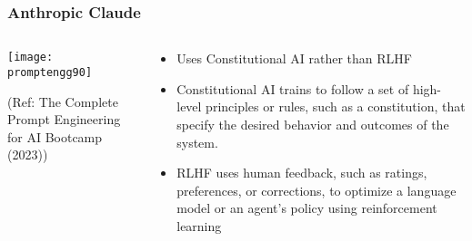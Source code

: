 



\begin{frame}[fragile]\frametitle{Anthropic Claude}


\begin{columns}
    \begin{column}[T]{0.6\linewidth}
		\begin{center}
		\texttt{[image: promptengg90]}

		{\tiny (Ref: The Complete Prompt Engineering for AI Bootcamp (2023))}
		\end{center}	
    \end{column}
    \begin{column}[T]{0.4\linewidth}
	
	    \begin{itemize}
        \item 
		Uses Constitutional AI rather than RLHF
		\item Constitutional AI trains to follow a set of high-level principles or rules, such as a constitution, that specify the desired behavior and outcomes of the system.
		\item RLHF uses human feedback, such as ratings, preferences, or corrections, to optimize a language model or an agent’s policy using reinforcement learning
	    \end{itemize}
		
    \end{column}
  \end{columns}
\end{frame}

